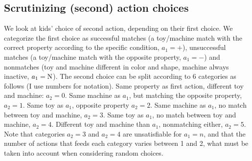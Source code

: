 \documentclass[11pt, a4paper]{article}
\begin{document}
\subsection*{Scrutinizing (second) action choices}
We look at kids' choice of second action, depending on their first choice. We categorize the first choice as successful matches (a toy/machine match with the correct property according to the specific condition, $a_1=+$), unsuccessful matches (a toy/machine match with the opposite property, $a_1=-$) and nonmatches (toy and machine different in color and shape, machine always inactive, $a_1={\textrm N}$). The second choice can be split according to 6 categories as follows (I use numbers for notation). Same property as first action, different toy and machine: $a_2=0$. Same machine as $a_1$, but matching the opposite property, $a_2=1$. Same toy as $a_1$, opposite property $a_2=2$. Same machine as $a_1$, no match between toy and machine, $a_2=3$. Same toy as $a_1$, no match between toy and machine, $a_2=4$. Different toy and machine than $a_1$, nonmatching either, $a_2=5$. Note that categories $a_2=3$ and $a_2=4$ are unsatisfiable for $a_1=n$, and that the number of actions that feeds each category varies between 1 and 2, what must be taken into account when considering random choices. 
\end{document}
